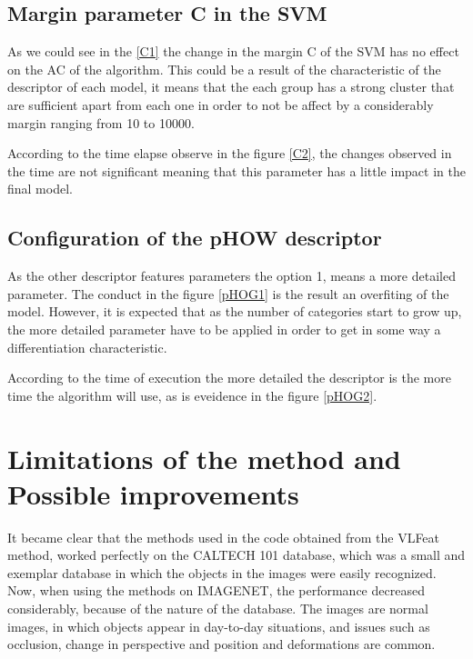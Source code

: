 \documentclass[10pt,twocolumn,letterpaper]{article}
\begin{document}
\subsection{Margin parameter C in the SVM}

As we could see in the \ref{C1} the change in the margin C of the SVM has no effect on the AC of the algorithm. This could be a result of the characteristic of the descriptor of each model, it means that the each group has a strong cluster that are sufficient apart from each one in order to not be affect by a considerably margin ranging from 10 to 10000. 

According to the time elapse observe in the figure \ref{C2}, the changes observed in the time are not significant meaning that this parameter has a little impact in the final model.

\subsection{Configuration of the pHOW descriptor}

As the other descriptor features parameters the option 1, means a more detailed parameter. The conduct in the figure \ref{pHOG1} is the result an overfiting of the model. However, it is expected that as the number of categories start to grow up, the more detailed parameter have to be applied in order to get in some way a differentiation characteristic.

According to the time of execution the more detailed the descriptor is the more time the algorithm will use, as is eveidence in the figure \ref{pHOG2}.





\section{Limitations of the method and Possible improvements}

It became clear that the methods used in the code obtained from the VLFeat method, worked perfectly on the CALTECH 101 database, which was a small and exemplar database in which the objects in the images were easily recognized. Now, when using the methods on IMAGENET, the performance decreased considerably, because of the nature of the database. The images are normal images, in which objects appear in day-to-day situations, and issues such as occlusion, change in perspective and position and deformations are common.\\
\end{document}
